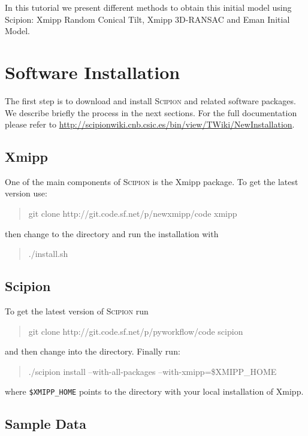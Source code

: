 \documentclass[12pt]{article} %
\newcommand{\scipion}{\textsc{Scipion} }
\newenvironment{command}{\tt\begin{quote}}{\end{quote}}
\begin{document}
In this tutorial we present different methods to obtain this initial
model using Scipion: Xmipp Random Conical Tilt, Xmipp 3D-RANSAC and
Eman Initial Model.

\section{Software Installation}

The first step is to download and install \scipion and related
software packages. We describe briefly the process in the next
sections. For the full documentation please refer to
\url{http://scipionwiki.cnb.csic.es/bin/view/TWiki/NewInstallation}.

\subsection{Xmipp}

One of the main components of \scipion is the Xmipp package. To get
the latest version use:

\begin{command}
git clone http://git.code.sf.net/p/newxmipp/code xmipp
\end{command}

\noindent
then change to the  directory and run the installation with

\begin{command}
./install.sh
\end{command}

\subsection{Scipion}

To get the latest version of \scipion run

\begin{command}
git clone http://git.code.sf.net/p/pyworkflow/code scipion
\end{command}

\noindent
and then change into the  directory. Finally run:

\begin{command}
./scipion install --with-all-packages --with-xmipp=\$XMIPP\_HOME
\end{command}

\noindent
where \verb+$XMIPP_HOME+ points to the directory with your local
installation of Xmipp.

\subsection{Sample Data}
\end{document}

